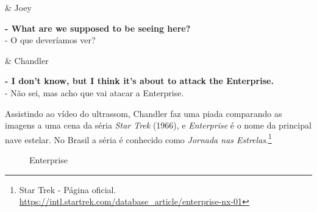 \begin{tcolorbox}[enhanced,center upper,
    drop fuzzy shadow southeast, boxrule=0.3pt,
    lower separated=false,
    colframe=black!30!dialogoBorder,colback=white]
\begin{minipage}[c]{0.16\linewidth}
   & \centering \scriptsize{Joey}
\end{minipage}
\hfill
\begin{minipage}[c]{0.8\linewidth}
  \textbf{- What are we supposed to be seeing here?}\\
  - O que deveríamos ver?
\end{minipage}

\medskip
\begin{minipage}[c]{0.16\linewidth}
   & \centering \scriptsize{Chandler}
\end{minipage}
\hfill
\begin{minipage}[c]{0.8\linewidth}
  \textbf{- I don't know, but I think it's about to attack the Enterprise.}\\
  - Não sei, mas acho que vai atacar a Enterprise.
\end{minipage}
\end{tcolorbox}

Assistindo ao vídeo do ultrassom, Chandler faz uma piada comparando as
imagens a uma cena da séria \emph{Star Trek} (1966), e \emph{Enterprise}
é o nome da principal nave estelar. No Brasil a séria é conhecido como
\emph{Jornada nas Estrelas}.\footnote{\sloppy Star Trek - Página oficial. \url{https://intl.startrek.com/database_article/enterprise-nx-01}}

\begin{figure}
  \centering
    \caption{Enterprise\label{fig:enterprise}}
\end{figure}
